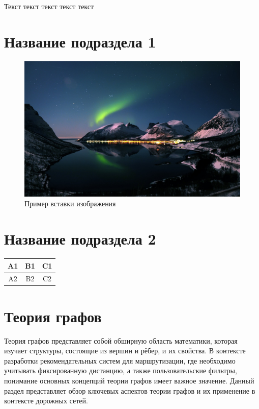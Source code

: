 Текст текст текст текст текст\\

\section{Название подраздела 1}

\begin{figure}[H]
	\begin{center}
		\includegraphics[width=0.7\linewidth]{src/img/img_example.png}
		\caption{Пример вставки изображения}
		\label{fig:img_example}
	\end{center}
\end{figure}

\section{Название подраздела 2}

\begin{center}
		\begin{tabular}{|c|c|c|}
			\hline
			A1 & B1 & C1 \\ \hline
			A2 & B2 & C2 \\ \hline
		\end{tabular}
\end{center}
\label{tab:tab_example}


\section{Теория графов}
Теория графов представляет собой обширную область математики, которая изучает структуры, состоящие из вершин и рёбер, и их свойства. В контексте разработки рекомендательных систем для маршрутизации, где необходимо учитывать фиксированную дистанцию, а также пользовательские фильтры, понимание основных концепций теории графов имеет важное значение. Данный раздел представляет обзор ключевых аспектов теории графов и их применение в контексте дорожных сетей.

